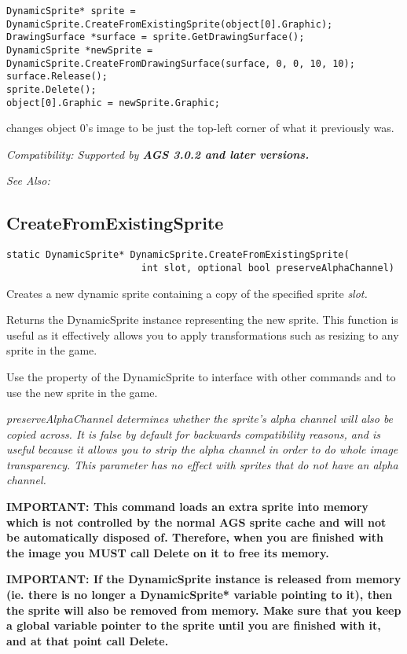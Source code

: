\begin{verbatim}
DynamicSprite* sprite = DynamicSprite.CreateFromExistingSprite(object[0].Graphic);
DrawingSurface *surface = sprite.GetDrawingSurface();
DynamicSprite *newSprite = DynamicSprite.CreateFromDrawingSurface(surface, 0, 0, 10, 10);
surface.Release();
sprite.Delete();
object[0].Graphic = newSprite.Graphic;
\end{verbatim}
changes object 0's image to be just the top-left corner of what it previously was.

\it{Compatibility:} Supported by \bf{AGS 3.0.2} and later versions.

\it{See Also:} 


\subsection{CreateFromExistingSprite}\label{DynamicSprite.CreateFromExistingSprite}%

\begin{verbatim}
static DynamicSprite* DynamicSprite.CreateFromExistingSprite(
                        int slot, optional bool preserveAlphaChannel)
\end{verbatim}
Creates a new dynamic sprite containing a copy of the specified sprite \it{slot}.

Returns the DynamicSprite instance representing the new sprite. This function
is useful as it effectively allows you to apply transformations such as resizing to
any sprite in the game.

Use the  property of the DynamicSprite to
interface with other commands and to use the new sprite in the game.

\it{preserveAlphaChannel} determines whether the sprite's alpha channel will also
be copied across. It is false by default for backwards compatibility reasons, and
is useful because it allows you to strip the alpha channel in order to do whole image
transparency. This parameter has no effect with sprites that do not have an alpha
channel.

\bf{IMPORTANT:} This command loads an extra sprite into memory which is not controlled
by the normal AGS sprite cache and will not be automatically disposed of. Therefore, when
you are finished with the image you \bf{MUST} call Delete on it to free its memory.

\bf{IMPORTANT:} If the DynamicSprite instance is released from memory (ie. there is
no longer a DynamicSprite* variable pointing to it), then the sprite will also be
removed from memory. Make sure that you keep a global variable pointer to the sprite
until you are finished with it, and at that point call Delete.

